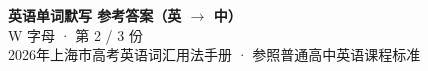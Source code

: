 \documentclass[10pt,a4paper]{article}
\begin{document}
\pagestyle{plain}

\begin{center}
{\LARGE\bfseries 英语单词默写 \quad 参考答案（英 $\to$ 中）}\\[0.22em]
{\large W 字母 · 第 2 / 3 份}\\[0.18em]
{\small 2026年上海市高考英语词汇用法手册 · 参照普通高中英语课程标准}
\end{center}

\vspace{0.2em}
\noindent{\color{rulegray}\rule{\textwidth}{0.8pt}}

\vspace{0.35em}

\vspace{0.25em}
\renewcommand{\arraystretch}{1.32}
\end{document}
